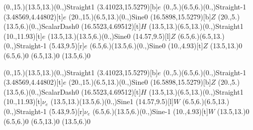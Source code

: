 \begin{feynartspicture}
\FADiagram{}
\FAProp(0.,15.)(13.5,13.)(0.,){Straight}{1}
\FALabel(3.41023,15.5279)[b]{$e$}
\FAProp(0.,5.)(6.5,6.)(0.,){Straight}{-1}
\FALabel(3.48569,4.44802)[t]{$e$}
\FAProp(20.,15.)(6.5,13.)(0.,){Sine}{0}
\FALabel(16.5898,15.5279)[b]{$Z$}
\FAProp(20.,5.)(13.5,6.)(0.,){ScalarDash}{0}
\FALabel(16.5523,4.69512)[t]{$H$}
\FAProp(13.5,13.)(6.5,13.)(0.,){Straight}{1}
\FALabel(10.,11.93)[t]{$e$}
\FAProp(13.5,13.)(13.5,6.)(0.,){Sine}{0}
\FALabel(14.57,9.5)[l]{$Z$}
\FAProp(6.5,6.)(6.5,13.)(0.,){Straight}{-1}
\FALabel(5.43,9.5)[r]{$e$}
\FAProp(6.5,6.)(13.5,6.)(0.,){Sine}{0}
\FALabel(10.,4.93)[t]{$Z$}
\FAVert(13.5,13.){0}
\FAVert(6.5,6.){0}
\FAVert(6.5,13.){0}
\FAVert(13.5,6.){0}

\FADiagram{}
\FAProp(0.,15.)(13.5,13.)(0.,){Straight}{1}
\FALabel(3.41023,15.5279)[b]{$e$}
\FAProp(0.,5.)(6.5,6.)(0.,){Straight}{-1}
\FALabel(3.48569,4.44802)[t]{$e$}
\FAProp(20.,15.)(6.5,13.)(0.,){Sine}{0}
\FALabel(16.5898,15.5279)[b]{$Z$}
\FAProp(20.,5.)(13.5,6.)(0.,){ScalarDash}{0}
\FALabel(16.5523,4.69512)[t]{$H$}
\FAProp(13.5,13.)(6.5,13.)(0.,){Straight}{1}
\FALabel(10.,11.93)[t]{$\nu_e$}
\FAProp(13.5,13.)(13.5,6.)(0.,){Sine}{1}
\FALabel(14.57,9.5)[l]{$W$}
\FAProp(6.5,6.)(6.5,13.)(0.,){Straight}{-1}
\FALabel(5.43,9.5)[r]{$\nu_e$}
\FAProp(6.5,6.)(13.5,6.)(0.,){Sine}{-1}
\FALabel(10.,4.93)[t]{$W$}
\FAVert(13.5,13.){0}
\FAVert(6.5,6.){0}
\FAVert(6.5,13.){0}
\FAVert(13.5,6.){0}
\end{feynartspicture}

